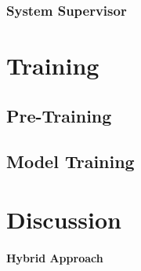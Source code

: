 \documentclass{article}
\begin{document}
	\subsubsection{System Supervisor}

	\section{Training}

	\subsection{Pre-Training}

	\subsection{Model Training}

	\section{Discussion}

	\paragraph{Hybrid Approach}
\end{document}

